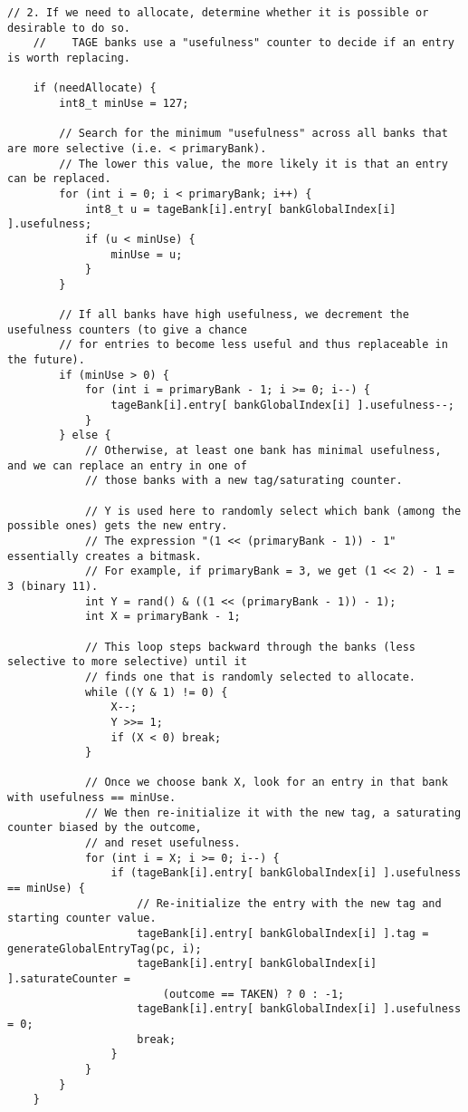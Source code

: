 \documentclass[sigconf, screen]{acmart}
\begin{document}
\begin{Verbatim}[fontsize=\tiny, breaklines=true]
    // 2. If we need to allocate, determine whether it is possible or desirable to do so.
    //    TAGE banks use a "usefulness" counter to decide if an entry is worth replacing.

    if (needAllocate) {
        int8_t minUse = 127;

        // Search for the minimum "usefulness" across all banks that are more selective (i.e. < primaryBank).
        // The lower this value, the more likely it is that an entry can be replaced.
        for (int i = 0; i < primaryBank; i++) {
            int8_t u = tageBank[i].entry[ bankGlobalIndex[i] ].usefulness;
            if (u < minUse) {
                minUse = u;
            }
        }

        // If all banks have high usefulness, we decrement the usefulness counters (to give a chance
        // for entries to become less useful and thus replaceable in the future).
        if (minUse > 0) {
            for (int i = primaryBank - 1; i >= 0; i--) {
                tageBank[i].entry[ bankGlobalIndex[i] ].usefulness--;
            }
        } else {
            // Otherwise, at least one bank has minimal usefulness, and we can replace an entry in one of
            // those banks with a new tag/saturating counter.

            // Y is used here to randomly select which bank (among the possible ones) gets the new entry.
            // The expression "(1 << (primaryBank - 1)) - 1" essentially creates a bitmask. 
            // For example, if primaryBank = 3, we get (1 << 2) - 1 = 3 (binary 11).
            int Y = rand() & ((1 << (primaryBank - 1)) - 1);
            int X = primaryBank - 1;

            // This loop steps backward through the banks (less selective to more selective) until it
            // finds one that is randomly selected to allocate.
            while ((Y & 1) != 0) {
                X--;
                Y >>= 1;
                if (X < 0) break;
            }

            // Once we choose bank X, look for an entry in that bank with usefulness == minUse.
            // We then re-initialize it with the new tag, a saturating counter biased by the outcome,
            // and reset usefulness.
            for (int i = X; i >= 0; i--) {
                if (tageBank[i].entry[ bankGlobalIndex[i] ].usefulness == minUse) {
                    // Re-initialize the entry with the new tag and starting counter value.
                    tageBank[i].entry[ bankGlobalIndex[i] ].tag = generateGlobalEntryTag(pc, i);
                    tageBank[i].entry[ bankGlobalIndex[i] ].saturateCounter =
                        (outcome == TAKEN) ? 0 : -1;
                    tageBank[i].entry[ bankGlobalIndex[i] ].usefulness = 0;
                    break;
                }
            }
        }
    }


\end{Verbatim}
\end{document}
